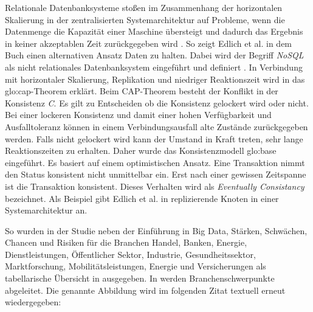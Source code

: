 Relationale Datenbanksysteme stoßen im Zusammenhang der horizontalen Skalierung in der zentralisierten Systemarchitektur auf Probleme, wenn die Datenmenge die Kapazität einer Maschine übersteigt und dadurch das Ergebnis in keiner akzeptablen Zeit zurückgegeben wird . So zeigt Edlich et al. in dem Buch  einen alternativen Ansatz Daten zu halten. Dabei wird der Begriff \textit{NoSQL} als nicht relationales Datenbanksystem eingeführt und definiert . In Verbindung mit horizontaler Skalierung, Replikation und niedriger Reaktionszeit wird in  das \gls{glo:cap}-Theorem erklärt. Beim CAP-Theorem besteht der Konflikt in der Konsistenz \textit{C}. Es gilt zu Entscheiden ob die Konsistenz gelockert wird oder nicht. Bei einer lockeren Konsistenz und damit einer hohen Verfügbarkeit und Ausfalltoleranz können in einem Verbindungsausfall alte Zustände zurückgegeben werden. Falls nicht gelockert wird kann der Umstand in Kraft treten, sehr lange Reaktionszeiten zu erhalten. %
Daher wurde das Konsistenzmodell \gls{glo:base} eingeführt. Es basiert auf einem optimistischen Ansatz. Eine Transaktion nimmt den Status konsistent nicht unmittelbar ein. Erst nach einer gewissen Zeitspanne ist die Transaktion konsistent. Dieses Verhalten wird als \textit{Eventually Consistancy} bezeichnet. Als Beispiel gibt Edlich et al. in  replizierende Knoten in einer Systemarchitektur an. 

So wurden in der Studie  neben der Einführung in Big Data, Stärken, Schwächen, Chancen und Risiken für die Branchen Handel, Banken, Energie, Dienstleistungen, Öffentlicher Sektor, Industrie, Gesundheitssektor, Marktforschung, Mobilitätsleistungen, Energie und Versicherungen als tabellarische Übersicht in  ausgegeben. In  werden Branchenschwerpunkte abgeleitet. Die genannte Abbildung wird im folgenden Zitat textuell erneut wiedergegeben:

